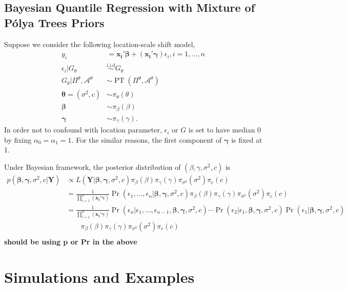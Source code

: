 \documentclass[12pt]{article}
\newcommand{\polya}{P\'{o}lya}
\newcommand{\iid}{\stackrel{\text{i.i.d}}{\sim}}
\DeclareMathOperator{\pr}{Pr}
\DeclareMathOperator{\pt}{PT}
\begin{document}
\subsection{Bayesian Quantile Regression with Mixture of \polya{}
  Trees Priors}
Suppose we consider the following location-scale shift model, 
\begin{align*}
y_i& = \bm{x_i'\beta} + (\bm{x_i'\gamma}) \epsilon_{i}, i = 1, \ldots,
n \\
\epsilon_i |G_{\theta} & \iid G_{\theta} \\
G_{\theta}|\Pi^{\theta}, \mathcal{A}^{\theta} & \sim \pt
(\Pi^{\theta}, \mathcal{A}^{\theta}) \\
\bm{\theta} = (\sigma^2, c) & \sim \pi_{\theta}(\theta) \\
\bm{\beta} & \sim \pi_{\beta}(\beta)\\
\bm{\gamma} &\sim \pi_{\gamma}(\gamma).
\end{align*} 
In order not to confound with location parameter, $\epsilon_i $ or $G$
is set to have median 0 by fixing $\alpha_0=\alpha_1 = 1$. For the
similar reasons,
the first component of $\bm{\gamma}$ is fixed
at 1. 

Under Bayesian framework, the posterior distribution of $(\beta,
\gamma, \sigma^2, c)$ is 
\begin{align*}
p(\bm{\beta}, \bm{\gamma}, \sigma^2, c|\bm{Y}) & \propto L(\bm{Y}|
\bm{\beta}, \bm{\gamma}, \sigma^2, c) \pi_{\beta}(\beta)
\pi_{\gamma}(\gamma) \pi_{\sigma^2}(\sigma^2) \pi_c(c) \\
& = \frac{1}{\prod_{i=1}^n (\bm{x_i'\gamma})} \pr \left( \epsilon_1,
  \ldots, \epsilon_n | \bm{\beta}, \bm{\gamma}, \sigma^2, c\right)
\pi_{\beta}(\beta)
\pi_{\gamma}(\gamma) \pi_{\sigma^2}(\sigma^2) \pi_c(c) \\
& = \frac{1}{\prod_{i=1}^n (\bm{x_i'\gamma})} \pr \left(\epsilon_n| \epsilon_1,
  \ldots, \epsilon_{n-1} , \bm{\beta}, \bm{\gamma}, \sigma^2, c\right)
\cdots  \pr \left(\epsilon_2| \epsilon_1, \bm{\beta}, \bm{\gamma},
  \sigma^2, c\right)  \pr \left(\epsilon_1| \bm{\beta}, \bm{\gamma},
  \sigma^2, c\right)\\
& \qquad 
\pi_{\beta}(\beta)
\pi_{\gamma}(\gamma) \pi_{\sigma^2}(\sigma^2) \pi_c(c) \\
\end{align*}
{\bf should be using p or Pr in the above}

\section{Simulations and Examples}
\end{document}

